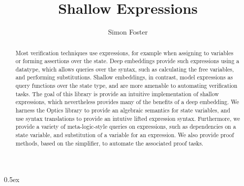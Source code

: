 \documentclass[11pt,a4paper]{article}
\begin{document}
\title{Shallow Expressions}
\author{Simon Foster}
\maketitle

\begin{abstract}
\noindent Most verification techniques use expressions, for example when assigning to variables or 
forming assertions over the state. Deep embeddings provide such expressions using a datatype, which 
allows queries over the syntax, such as calculating the free variables, and performing substitutions. 
Shallow embeddings, in contrast, model expressions as query functions over the state type, and are 
more amenable to automating verification tasks. The goal of this library is provide an intuitive 
implementation of shallow expressions, which nevertheless provides many of the benefits of a deep 
embedding. We harness the Optics library to provide an algebraic semantics for state variables,
and use syntax translations to provide an intutive lifted expression syntax. Furthermore, we
provide a variety of meta-logic-style queries on expressions, such as dependencies
on a state variable, and substitution of a variable for an expression. We also provide proof 
methods, based on the simplifier, to automate the associated proof tasks.
\end{abstract}

\tableofcontents

\parindent 0pt\parskip 0.5ex





\end{document}
